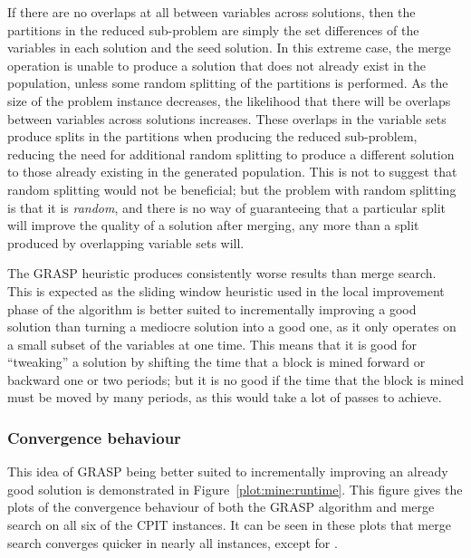\documentclass[journal]{IEEEtran}
\begin{document}
If there are no overlaps at all between variables across solutions, then the partitions in the reduced sub-problem are simply the set differences of the variables in each solution and the seed solution. In this extreme case, the merge operation is unable to produce a solution that does not already exist in the population, unless some random splitting of the partitions is performed. As the size of the problem instance decreases, the likelihood that there will be overlaps between variables across solutions increases. These overlaps in the variable sets produce splits in the partitions when producing the reduced sub-problem, reducing the need for additional random splitting to produce a different solution to those already existing in the generated population. This is not to suggest that random splitting would not be beneficial; but the problem with random splitting is that it is \emph{random}, and there is no way of guaranteeing that a particular split will improve the quality of a solution after merging, any more than a split produced by overlapping variable sets will.

The GRASP heuristic produces consistently worse results than merge search. This is expected as the sliding window heuristic used in the local improvement phase of the algorithm is better suited to incrementally improving a good solution than turning a mediocre solution into a good one, as it only operates on a small subset of the variables at one time. This means that it is good for ``tweaking'' a solution by shifting the time that a block is mined forward or backward one or two periods; but it is no good if the time that the block is mined must be moved by many periods, as this would take a lot of passes to achieve.

\subsubsection*{Convergence behaviour}

This idea of GRASP being better suited to incrementally improving an already good solution is demonstrated in Figure~\ref{plot:mine:runtime}. This figure gives the plots of the convergence behaviour of both the GRASP algorithm and merge search on all six of the CPIT instances. It can be seen in these plots that merge search converges quicker in nearly all instances, except for \dmine{}. 
\end{document}
